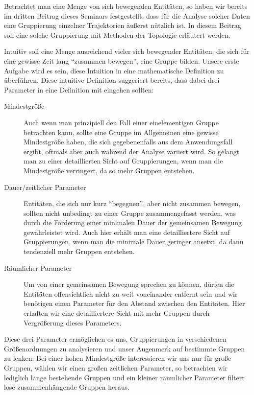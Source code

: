Betrachtet man eine Menge von sich bewegenden Entitäten, so haben wir bereits im dritten Beitrag dieses Seminars festgestellt, dass für die Analyse solcher Daten eine Gruppierung einzelner Trajektorien äußerst nützlich ist.
In diesem Beitrag soll eine solche Gruppierung mit Methoden der Topologie erläutert werden.

Intuitiv soll eine Menge ausreichend vieler sich bewegender Entitäten, die sich für eine gewisse Zeit lang \enquote{zusammen bewegen}, eine Gruppe bilden.
Unsere erste Aufgabe wird es sein, diese Intuition in eine mathematische Definition zu überführen.
Diese intuitive Definition suggeriert bereits, dass dabei drei Parameter in eine Definition mit eingehen sollten:
\begin{description}
	\item[Mindestgröße] Auch wenn man prinzipiell den Fall einer einelementigen Gruppe betrachten kann, sollte eine Gruppe im Allgemeinen eine gewisse Mindestgröße haben, die sich gegebenenfalls aus dem Anwendungsfall ergibt, oftmals aber auch während der Analyse variiert wird.
	So gelangt man zu einer detaillierten Sicht auf Gruppierungen, wenn man die Mindestgröße verringert, da so mehr Gruppen entstehen.
	\item[Dauer/zeitlicher Parameter] Entitäten, die sich nur kurz \enquote{begegnen}, aber nicht zusammen bewegen, sollten nicht unbedingt zu einer Gruppe zusammengefasst werden, was durch die Forderung einer minimalen Dauer der gemeinsamen Bewegung gewährleistet wird.
	Auch hier erhält man eine detailliertere Sicht auf Gruppierungen, wenn man die minimale Dauer geringer ansetzt, da dann tendenziell mehr Gruppen entstehen.
	\item[Räumlicher Parameter] Um von einer gemeinsamen Bewegung sprechen zu können, dürfen die Entitäten offensichtlich nicht zu weit voneinander entfernt sein und wir benötigen einen Parameter für den Abstand zwischen den Entitäten.
	Hier erhalten wir eine detailliertere Sicht mit mehr Gruppen durch Vergrößerung dieses Parameters.
\end{description}
Diese drei Parameter ermöglichen es uns, Gruppierungen in verschiedenen Größenordnungen zu analysieren und unser Augenmerk auf bestimmte Gruppen zu lenken: Bei einer hohen Mindestgröße interessieren wir uns nur für große Gruppen, wählen wir einen großen zeitlichen Parameter, so betrachten wir lediglich lange bestehende Gruppen und ein kleiner räumlicher Parameter filtert lose zusammenhängende Gruppen heraus.

